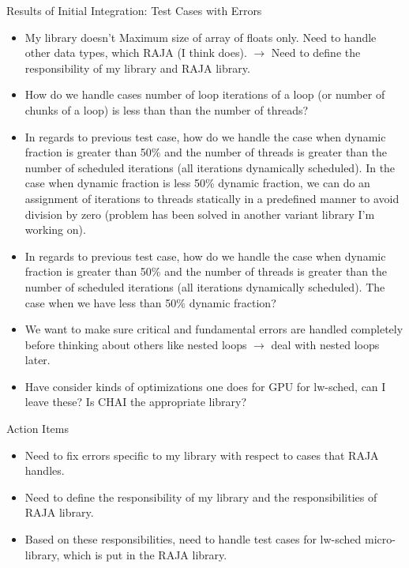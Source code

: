 \documentclass{beamer}
\begin{document}
\begin{frame}[allowframebreaks]{Results of Initial Integration: Test Cases with Errors}
\begin{itemize}
\small \item \small My library doesn't Maximum size of array of floats only. Need to handle other data types, which RAJA (I think does). $\rightarrow$ Need to define the responsibility of my library and RAJA library.
\item \small How do we handle cases number of loop iterations of a loop (or number of chunks of a loop) is less than than the number of threads?
\item \small In regards to previous test case, how do we handle the case when dynamic fraction is greater than 50\% and the number of threads is greater than the number of scheduled iterations (all iterations dynamically scheduled). In the case when dynamic fraction is less 50\% dynamic fraction, we can do an assignment of iterations to threads statically in a predefined manner to avoid division by zero (problem has been solved in another variant library I'm working on).
\item \small In regards to previous test case, how do we handle the case when dynamic fraction is greater than 50\% and the number of threads is greater than the number of scheduled iterations (all iterations dynamically scheduled). The case when we have less than 50\% dynamic fraction?
\item \small We want to make sure critical and fundamental errors are handled completely before thinking about others like nested loops $\rightarrow$ deal with nested loops later. 
\item \small Have consider kinds of optimizations one does for GPU for lw-sched, can I leave these? Is CHAI the appropriate library?
\end{itemize}
\end{frame}

\begin{frame}{Action Items}
\begin{itemize}
\item Need to fix errors specific to my library with respect to cases that RAJA handles. 
\item Need to define the responsibility of my library and the responsibilities of RAJA library.
\item Based on these responsibilities, need to handle test cases for lw-sched micro-library, which is put in the RAJA library. 
\end{itemize}
\end{frame}
\end{document}
